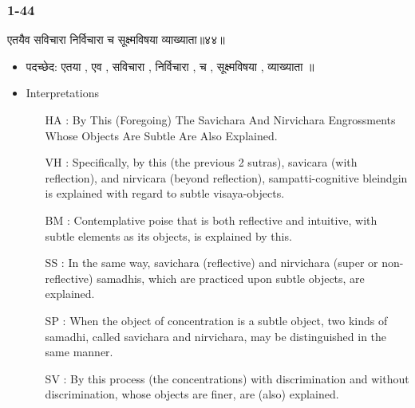 \begin{frame}[fragile]\frametitle{1-44}
\begin{sanskrit}
एतयैव सविचारा निर्विचारा च सूक्ष्मविषया व्याख्याता॥४४॥
\end{sanskrit}

	\begin{itemize}
	\item पदच्छेद: एतया , एव , सविचारा , निर्विचारा , च , सूक्ष्मविषया , व्याख्याता ॥
	\item Interpretations
		\begin{itemize}
		\item [HA]: By This (Foregoing) The Savichara And Nirvichara Engrossments Whose Objects Are Subtle Are Also Explained.
		\item [VH]: Specifically, by this (the previous 2 sutras), savicara (with reflection), and nirvicara (beyond reflection), sampatti-cognitive bleindgin is explained with regard to subtle visaya-objects.
		\item [BM]: Contemplative poise that is both reflective and intuitive, with subtle elements as its objects, is explained by this.
		\item [SS]: In the same way, savichara (reflective) and nirvichara (super or non-reflective) samadhis, which are practiced upon subtle objects, are explained.
		\item [SP]: When the object of concentration is a subtle object, two kinds of samadhi, called savichara and nirvichara, may be distinguished in the same manner.
		\item [SV]: By this process (the concentrations) with discrimination and without discrimination, whose objects are finer, are (also) explained. 
		\end{itemize}
	\end{itemize}
	
\end{frame}



